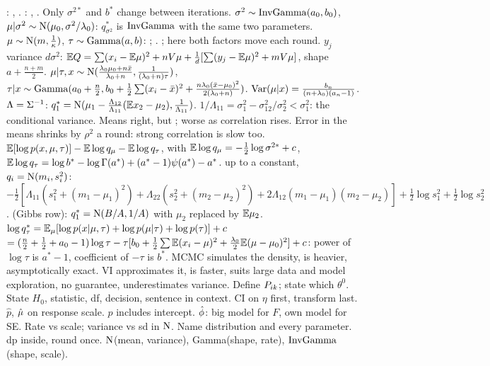 \sk{}: , .
\sk{}: , .
\sk Only $\sigma^{2*}$ and $b^*$ change between iterations.  $\sigma^2\sim\mathrm{InvGamma}(a_0,b_0)$, $\mu|\sigma^2\sim\mathrm{N}(\mu_0,\sigma^2/\lambda_0)$: $q_{\sigma^2}^*$ is $\mathrm{InvGamma}$ with the same two parameters.
\sk{} $\mu\sim\mathrm{N}(m,\frac1\kappa)$, $\tau\sim\mathrm{Gamma}(a,b)$: ; . ; here both factors move each round.  $y_j$ variance $d\sigma^2$: $\mathbb{E} Q=\sum(x_i-\mathbb{E}\mu)^2+nV\mu+\frac1d[\sum(y_j-\mathbb{E}\mu)^2+mV\mu]$, shape $a+\frac{n+m}2$.
\sk{} $\mu|\tau,x\sim\mathrm{N}(\frac{\lambda_0\mu_0+n\bar x}{\lambda_0+n},\frac1{(\lambda_0+n)\tau})$, $\tau|x\sim\mathrm{Gamma}(a_0+\frac n2,b_0+\frac12\sum(x_i-\bar x)^2+\frac{n\lambda_0(\bar x-\mu_0)^2}{2(\lambda_0+n)})$. $\mathrm{Var}(\mu|x)=\frac{b_n}{(n+\lambda_0)(a_n-1)}$.
\sk{} $\Lambda=\Sigma^{-1}$: $q_1^*=\mathrm{N}(\mu_1-\frac{\Lambda_{12}}{\Lambda_{11}}(\mathbb{E} x_2-\mu_2),\frac1{\Lambda_{11}})$. $1/\Lambda_{11}=\sigma_1^2-\sigma_{12}^2/\sigma_2^2<\sigma_1^2$: the conditional variance. Means right, but ; worse as correlation rises. Error in the means shrinks by $\rho^2$ a round: strong correlation is slow too.
\sk{} $\mathbb{E}[\log p(x,\mu,\tau)]-\mathbb{E}\log q_\mu-\mathbb{E}\log q_\tau$, with $\mathbb{E}\log q_\mu=-\frac12\log\sigma^{2*}+c$, $\mathbb{E}\log q_\tau=\log b^*-\log\Gamma(a^*)+(a^*-1)\psi(a^*)-a^*$.
\sk{} up to a constant, $q_i=\mathrm{N}(m_i,s_i^2)$: $-\frac12[\Lambda_{11}(s_1^2+(m_1-\mu_1)^2)+\Lambda_{22}(s_2^2+(m_2-\mu_2)^2)+2\Lambda_{12}(m_1-\mu_1)(m_2-\mu_2)]+\frac12\log s_1^2+\frac12\log s_2^2$.
\sk{} (Gibbs row): $q_1^*=\mathrm{N}(B/A,1/A)$ with $\mu_2$ replaced by $\mathbb{E}\mu_2$.
\sk{} $\log q_\tau^*=\mathbb{E}_\mu[\log p(x|\mu,\tau)+\log p(\mu|\tau)+\log p(\tau)]+c$ $=(\frac n2+\frac12+a_0-1)\log\tau-\tau[b_0+\frac12\sum\mathbb{E}(x_i-\mu)^2+\frac{\lambda_0}2\mathbb{E}(\mu-\mu_0)^2]+c$: power of $\log\tau$ is $a^*-1$, coefficient of $-\tau$ is $b^*$.
\bx
{} MCMC simulates the density, is heavier, asymptotically exact. VI approximates it, is faster, suits large data and model exploration, no guarantee, underestimates variance.
\li Define $P_{ik}$; state which $\theta^0$. \li State $H_0$, statistic, df, decision, sentence in context. \li CI on $\eta$ first, transform last. \li $\hat p$, $\hat{\mu}$ on response scale. \li $p$ includes intercept. \li $\hat{\phi}$: big model for $F$, own model for SE. \li Rate vs scale; variance vs sd in $\mathrm{N}$. \li Name distribution and every parameter.  dp inside, round once. \li $\mathrm{N}$(mean, variance), Gamma(shape, rate), $\mathrm{InvGamma}$(shape, scale).
